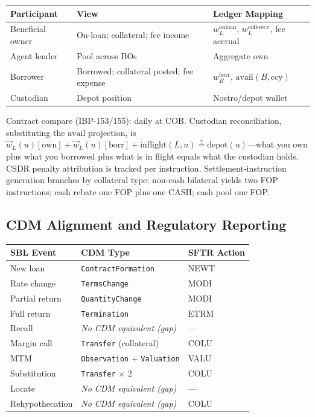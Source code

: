 \begin{center}
\small
\begin{tabular}{l p{4.5cm} p{3.5cm}}
\toprule
\textbf{Participant} & \textbf{View} & \textbf{Ledger Mapping} \\
\midrule
Beneficial owner & On-loan; collateral; fee income & $w^{\mathrm{onloan}}_L$, $w^{\mathrm{coll\text{-}recv}}_L$, fee accrual \\
Agent lender & Pool across BOs & Aggregate $\mathrm{own}$ \\
Borrower & Borrowed; collateral posted; fee expense & $w^{\mathrm{borr}}_B$, $\mathrm{avail}(B,\mathrm{ccy})$ \\
Custodian & Depot position & Nostro/depot wallet \\
\bottomrule
\end{tabular}
\end{center}

Contract compare (IBP-153/155): daily at COB. Custodian reconciliation, substituting the $\mathrm{avail}$ projection, is $\vec{w}_L(u)[\mathrm{own}] + \vec{w}_L(u)[\mathrm{borr}] + \mathrm{inflight}(L,u) \stackrel{?}{=} \text{depot}(u)$---what you own plus what you borrowed plus what is in flight equals what the custodian holds. CSDR penalty attribution is tracked per instruction. Settlement-instruction generation branches by collateral type: non-cash bilateral yields two FOP instructions; cash rebate one FOP plus one CASH; cash pool one FOP.

\subsection{CDM Alignment and Regulatory Reporting}
\label{sec:sbl-cdm}

\begin{center}
\small
\begin{tabular}{l l l}
\toprule
\textbf{SBL Event} & \textbf{CDM Type} & \textbf{SFTR Action} \\
\midrule
New loan & \texttt{ContractFormation} & NEWT \\
Rate change & \texttt{TermsChange} & MODI \\
Partial return & \texttt{QuantityChange} & MODI \\
Full return & \texttt{Termination} & ETRM \\
Recall & \emph{No CDM equivalent (gap)} & --- \\
Margin call & \texttt{Transfer} (collateral) & COLU \\
MTM & \texttt{Observation} + \texttt{Valuation} & VALU \\
Substitution & \texttt{Transfer} $\times$ 2 & COLU \\
Locate & \emph{No CDM equivalent (gap)} & --- \\
Rehypothecation & \emph{No CDM equivalent (gap)} & COLU \\
\bottomrule
\end{tabular}
\end{center}

